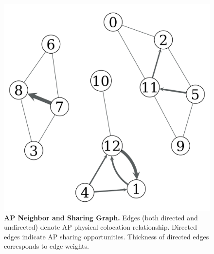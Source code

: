 \begin{figure}[t]
  \centering
  \includegraphics[width=\columnwidth]{./figures/HomeAPNeighborFigure.pdf}
  \caption{\textbf{AP Neighbor and Sharing Graph.} Edges (both directed and
    undirected) denote AP physical
    colocation relationship. Directed edges indicate AP sharing opportunities.
  Thickness of directed edges corresponds to edge weights.}
  \label{fig:reciprocal}
\end{figure}



\newpage
\clearpage

